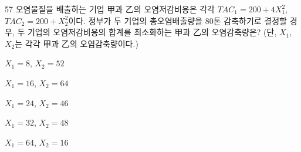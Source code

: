 \begin{question}{57}
오염물질을 배출하는 기업 甲과 乙의 오염저감비용은 각각 $TAC_1=200+4X_1^2$, $TAC_2=200+X_2^2$이다. 정부가 두 기업의 총오염배출량을 80톤 감축하기로 결정할 경우, 두 기업의 오염저감비용의 합계를 최소화하는 甲과 乙의 오염감축량은? (단, $X_1$, $X_2$는 각각 甲과 乙의 오염감축량이다.)
\begin{choices}
  \item $X_1 = 8$, $X_2 = 52$
  \item $X_1 = 16$, $X_2 = 64$
  \item $X_1 = 24$, $X_2 = 46$
  \item $X_1 = 32$, $X_2 = 48$
  \item $X_1 = 64$, $X_2 = 16$
\end{choices}
\end{question}
